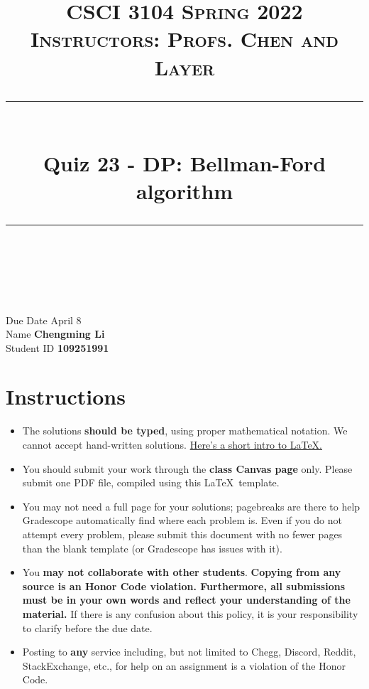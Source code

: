 \documentclass[11pt]{article}
\title{
\normalfont \normalsize 
\textsc{CSCI 3104 Spring 2022 \\ 
Instructors: Profs. Chen and Layer} \\
[10pt] 
\rule{\linewidth}{0.5pt} \\[6pt] 
\huge Quiz 23 - DP: Bellman-Ford algorithm \\
\rule{\linewidth}{2pt}  \\[10pt]
}
\date{}
\theoremstyle{definition}
\theoremstyle{definition}
\theoremstyle{definition}
\begin{document}

\maketitle


\noindent
Due Date \dotfill April 8 \\
Name \dotfill \textbf{Chengming Li} \\
Student ID \dotfill \textbf{109251991} \\


\tableofcontents

\section{Instructions}
 \begin{itemize}
	\item The solutions \textbf{should be typed}, using proper mathematical notation. We cannot accept hand-written solutions. \href{http://ece.uprm.edu/~caceros/latex/introduction.pdf}{Here's a short intro to \LaTeX.}
	\item You should submit your work through the \textbf{class Canvas page} only. Please submit one PDF file, compiled using this \LaTeX \ template.
	\item You may not need a full page for your solutions; pagebreaks are there to help Gradescope automatically find where each problem is. Even if you do not attempt every problem, please submit this document with no fewer pages than the blank template (or Gradescope has issues with it).

	\item You \textbf{may not collaborate with other students}. \textbf{Copying from any source is an Honor Code violation. Furthermore, all submissions must be in your own words and reflect your understanding of the material.} If there is any confusion about this policy, it is your responsibility to clarify before the due date. 

	\item Posting to \textbf{any} service including, but not limited to Chegg, Discord, Reddit, StackExchange, etc., for help on an assignment is a violation of the Honor Code.

\end{itemize}
\end{document}
